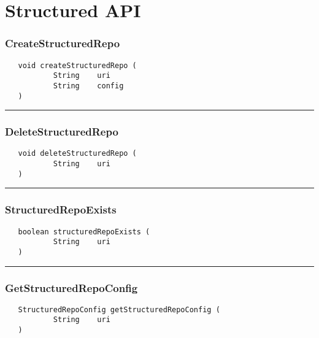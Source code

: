 \chapter{Structured API}

\subsection{CreateStructuredRepo}
\label{Api:CreateStructuredRepo}
\begin{verbatim}
   void createStructuredRepo (
           String    uri
           String    config
   )
\end{verbatim}



\rule{15cm}{2pt}
\subsection{DeleteStructuredRepo}
\label{Api:DeleteStructuredRepo}
\begin{verbatim}
   void deleteStructuredRepo (
           String    uri
   )
\end{verbatim}



\rule{15cm}{2pt}
\subsection{StructuredRepoExists}
\label{Api:StructuredRepoExists}
\begin{verbatim}
   boolean structuredRepoExists (
           String    uri
   )
\end{verbatim}



\rule{15cm}{2pt}
\subsection{GetStructuredRepoConfig}
\label{Api:GetStructuredRepoConfig}
\begin{verbatim}
   StructuredRepoConfig getStructuredRepoConfig (
           String    uri
   )
\end{verbatim}



